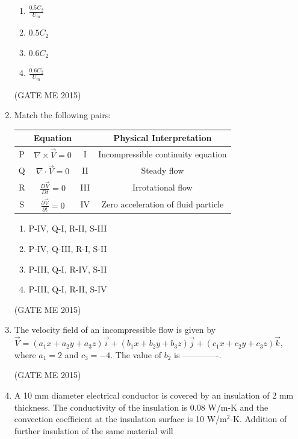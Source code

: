 \documentclass[journal]{IEEEtran}
\begin{document}
\begin{enumerate}
\begin{multicols}{4}
\begin{enumerate}
    \item $\frac{0.5C_2}{U_m}$
    \item $0.5C_2$
    \item $0.6C_2$
    \item $\frac{0.6C_2}{U_m}$
\end{enumerate}
\end{multicols}
\hfill  (GATE ME 2015)

\item Match the following pairs:

\begin{tabular}{|c|c|c|c|}
\hline
 & Equation & & Physical Interpretation \\
\hline
P & $ \nabla \times \vec{V} = 0 $ & I & Incompressible continuity equation \\
\hline
Q & $ \nabla \cdot \vec{V} = 0 $ & II & Steady flow \\
\hline
R & $ \frac{D\vec{V}}{Dt} = 0 $ & III & Irrotational flow \\
\hline
S & $ \frac{\partial \vec{V}}{\partial t} = 0 $ & IV & Zero acceleration of fluid particle \\
\hline
\end{tabular}

\begin{enumerate}
    \item P-IV, Q-I, R-II, S-III
    \item P-IV, Q-III, R-I, S-II
    \item P-III, Q-I, R-IV, S-II
    \item P-III, Q-I, R-II, S-IV
\end{enumerate}
\hfill  (GATE ME 2015)

\item The velocity field of an incompressible flow is given by
$ \vec{V} = (a_1 x + a_2 y + a_3 z)\vec{i} + (b_1 x + b_2 y + b_3 z)\vec{j} + (c_1 x + c_2 y + c_3 z)\vec{k} $, where $ a_1 = 2 $ and $ c_3 = -4 $. The value of $ b_2 $ is -------------.

\hfill  (GATE ME 2015)

\item A 10 mm diameter electrical conductor is covered by an insulation of 2 mm thickness. The conductivity of the insulation is 0.08 W/m-K and the convection coefficient at the insulation surface is 10 W/m$^2$-K. Addition of further insulation of the same material will


\end{enumerate}
\end{document}
